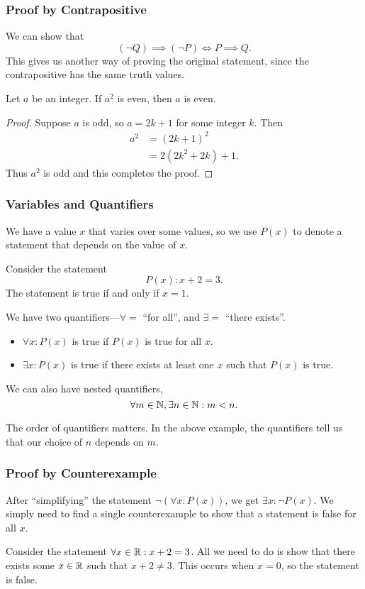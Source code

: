 \documentclass[class=article, crop=false]{standalone}
\begin{document}
  \subsubsection{Proof by Contrapositive}
  We can show that
  \[
    (\neg Q)\implies (\neg P) \iff P\implies Q.
  \]
  This gives us another way of proving the original statement, since the contrapositive has the same truth values.
  \begin{lemma}{1}
    Let $a$ be an integer. If $a^2$ is even, then $a$ is even.
    \begin{proof}
      Suppose $a$ is odd, so $a = 2k + 1$ for some integer $k$. Then
      \begin{align*}
        a^2 &= (2k + 1)^2 \\
            &= 2(2k^2 + 2k) + 1.
      \end{align*}
      Thus $a^2$ is odd and this completes the proof.
    \end{proof}
  \end{lemma}
  \subsubsection{Variables and Quantifiers}
  We have a value $x$ that varies over some values, so we use $P(x)$ to denote a statement that depends on the value of $x$.
  \begin{example}{}
    Consider the statement
    \[
      P(x): x + 2 = 3.
    \]
    The statement is true if and only if $x = 1$.
  \end{example}
  We have two quantifiers---$\forall =$ ``for all'', and $\exists =$ ``there exists''.
  \begin{itemize}
    \item 
      $\forall x : P(x)$ is true if $P(x)$ is true for all $x$.
    \item 
      $\exists x : P(x)$ is true if there exists at least one $x$ such that $P(x)$ is true.
  \end{itemize}
  We can also have nested quantifiers,
  \[
    \forall m\in\mathbb{N}, \exists n\in\mathbb{N} : m < n.
  \]
  \begin{note}{}
    The order of quantifiers matters. In the above example, the quantifiers tell us that our choice of $n$ depends on $m$.
  \end{note}
  \subsubsection{Proof by Counterexample}
  After ``simplifying'' the statement $\neg(\forall x : P(x))$, we get $\exists x : \neg P(x)$. We simply need to find a single counterexample to show that a statement is false for all $x$.
  \begin{example}{}
    Consider the statement $\forall x\in \mathbb{R} : x + 2 = 3$. All we need to do is show that there exists some $x\in \mathbb{R}$ such that $x + 2\neq 3$. This occurs when $x = 0$, so the statement is false.
  \end{example}
\end{document}
